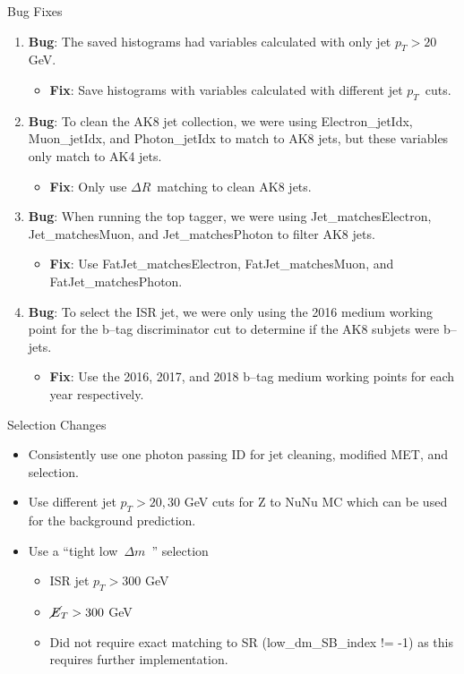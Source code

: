 \documentclass[10pt,xcolor=svgnames,fleqn,aspectratio=169]{beamer}
\newcommand{\dr}{$\Delta R$~}
\newcommand{\pt}{$p_{T}$~}
\newcommand{\lowdm}{low~$\Delta m$~}
\newcommand{\bug}{\textbf{Bug}}
\newcommand{\fix}{\textbf{Fix}}
\begin{document}
\begin{frame}{Bug Fixes}
\begin{enumerate}
\item \bug: The saved histograms had variables calculated with only jet $p_{T} > 20$ GeV.
\begin{itemize}
\item \fix: Save histograms with variables calculated with different jet \pt cuts.
\end{itemize}
\item \bug: To clean the AK8 jet collection, we were using Electron\_jetIdx, Muon\_jetIdx, and Photon\_jetIdx to match to AK8 jets, but these variables only match to AK4 jets.
\begin{itemize}
\item \fix: Only use \dr matching to clean AK8 jets.
\end{itemize}
\item \bug: When running the top tagger, we were using Jet\_matchesElectron, Jet\_matchesMuon, and Jet\_matchesPhoton to filter AK8 jets.
\begin{itemize}
\item \fix: Use FatJet\_matchesElectron, FatJet\_matchesMuon, and FatJet\_matchesPhoton.
\end{itemize}
\item \bug: To select the ISR jet, we were only using the 2016 medium working point for the b--tag discriminator cut to determine if the AK8 subjets were b--jets.
\begin{itemize}
\item \fix: Use the 2016, 2017, and 2018 b--tag medium working points for each year respectively.
\end{itemize}
\end{enumerate}
\end{frame}

\begin{frame}{Selection Changes}
\begin{itemize}
\item Consistently use one photon passing ID for jet cleaning, modified MET, and selection.
\item Use different jet $p_T > 20, 30$ GeV cuts for Z to NuNu MC which can be used for the background prediction.
\item Use a ``tight \lowdm'' selection
\begin{itemize}
\item ISR jet $p_{T} > 300$ GeV
\item $\cancel{E}_{T} > 300$ GeV
\item Did not require exact matching to SR (low\_dm\_SB\_index != -1) as this requires further implementation.
\end{itemize}
\end{itemize}
\end{frame}
\end{document}
